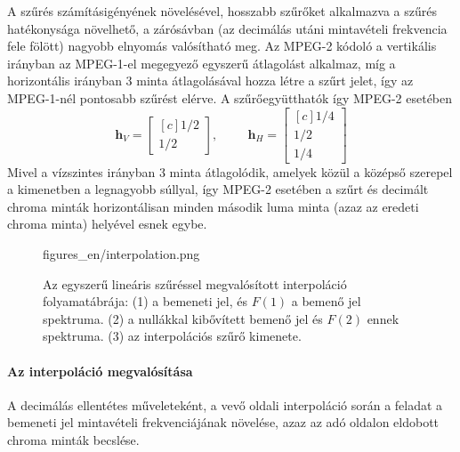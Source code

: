 A szűrés számításigényének növelésével, hosszabb szűrőket alkalmazva a szűrés hatékonysága növelhető, a zárósávban (az decimálás utáni mintavételi frekvencia fele fölött) nagyobb elnyomás valósítható meg.
Az MPEG-2 kódoló a vertikális irányban az MPEG-1-el megegyező egyszerű átlagolást alkalmaz, míg a horizontális irányban 3 minta átlagolásával hozza létre a szűrt jelet, így az MPEG-1-nél pontosabb szűrést elérve.
A szűrőegyütthatók így MPEG-2 esetében
\begin{equation}
\mathbf{h}_V =
\begin{bmatrix}[c]
       1/2 \\[0.3em]
       1/2\end{bmatrix}
,
\hspace{1cm}
\mathbf{h}_H =
\begin{bmatrix}[c]
       1/4 \\[0.3em]
       1/2 \\[0.3em]
       1/4\end{bmatrix}
\end{equation}
Mivel a vízszintes irányban 3 minta átlagolódik, amelyek közül a középső szerepel a kimenetben a legnagyobb súllyal, így MPEG-2 esetében a szűrt és decimált chroma minták horizontálisan minden második luma minta (azaz az eredeti chroma minta) helyével esnek egybe.
\begin{figure}[]
	\centering
	\begin{overpic}[width = 0.8\columnwidth]{figures_en/interpolation.png}
 	\end{overpic}
	\caption{Az egyszerű lineáris szűréssel megvalósított interpoláció folyamatábrája:
	(1) a bemeneti jel, és $F(1)$ a bemenő jel spektruma.
	(2) a nullákkal kibővített bemenő jel és $F(2)$ ennek spektruma.
	(3) az interpolációs szűrő kimenete.}
	\label{Fig:interpolation}
\end{figure}

\paragraph{Az interpoláció megvalósítása}
A decimálás ellentétes műveleteként, a vevő oldali interpoláció során a feladat a bemeneti jel mintavételi frekvenciájának növelése, azaz az adó oldalon eldobott chroma minták becslése.

